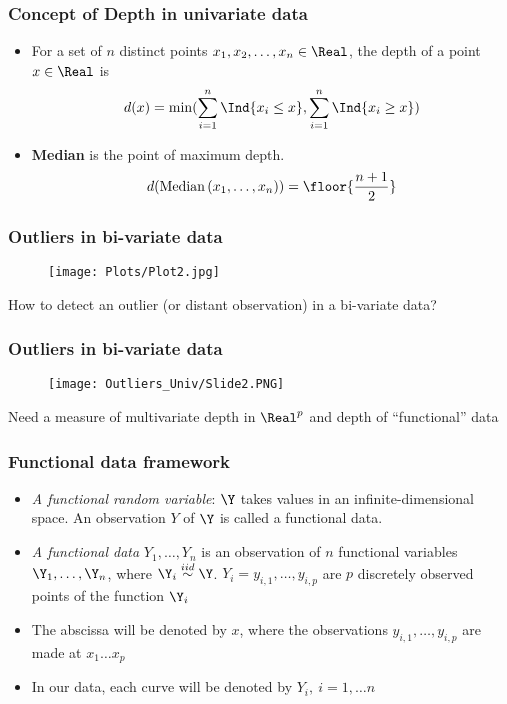 \documentclass[10pt,dvipsnames,table]{beamer}
\begin{document}
\begin{frame}
\frametitle{Concept of Depth in univariate data}
\begin{itemize}
\item For a set of $n$ distinct points $x_1, x_2, \dots, x_n \in \Real$, the depth of a point $x \in \Real$ is
\[ d(x) = \min(\sum \limits_{i = 1}^n \Ind\{ x_i \leq x\}, \sum \limits_{i = 1}^n \Ind\{ x_i \geq x\}) \]
\vspace{0.5cm}
\item {\bf{Median}} is the point of maximum depth. 
\[ d(\text{Median}\left(x_1, \dots, x_n)\right) = \floor{\frac{n + 1}{2}} \]
\end{itemize}
\end{frame}

\begin{frame}
\frametitle{Outliers in bi-variate data}
\vspace{-0.5cm}
\begin{figure}[t]
\centering
\texttt{[image: Plots/Plot2.jpg]}
\end{figure}
\vspace{-0.5cm}
How to detect an outlier (or distant observation) in a bi-variate data?
\end{frame}

\begin{frame}
\frametitle{Outliers in bi-variate data}
\vspace{-0.5cm}
\begin{figure}[t]
\centering
\texttt{[image: Outliers\_Univ/Slide2.PNG]}
\end{figure}
\vspace{-0.5cm}
Need a measure of multivariate depth in $\Real ^ p$ and depth of ``functional'' data
\end{frame}

\begin{frame}
\frametitle{Functional data framework}
\begin{itemize}
\item {\emph{A functional random variable}}: $\Y$ takes values in an infinite-dimensional space. An observation $Y$ of $\Y$ is called a functional data.
\item {\emph{A functional data}} $Y_1, \dots, Y_n$ is an observation of $n$ functional variables $\Y_1, \dots, \Y_n$, where $\Y_i \stackrel{iid}{\sim} \Y$. $Y_i = {y_{i,1}, \dots, y_{i,p}}$ are $p$ discretely observed points of the function $\Y_i$
\item The abscissa will be denoted by $x$, where the observations $y_{i,1}, \dots, y_{i,p}$ are made at $x_1 \dots x_p$
\item In our data, each curve will be denoted by $Y_i, \ i = 1, \dots n$
\end{itemize}
\end{frame}
\end{document}
